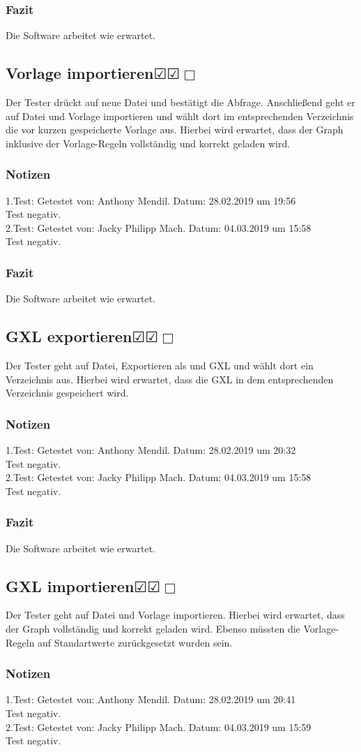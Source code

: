 \documentclass[enabledeprecatedfontcommands]{scrartcl}
\newcommand{\subsectiont}[2]{\subsection[#1]{#1{\normalsize\normalfont #2}}}
\newcommand{\leer}{$\Box$}
\newcommand{\ok}{$\CheckedBox$}
\begin{document}
\subsubsection{Fazit}
Die Software arbeitet wie erwartet.

\subsectiont{Vorlage importieren}{\dotfill\ok\ok\leer}
Der Tester drückt auf neue Datei und bestätigt die Abfrage. Anschließend geht er auf Datei und Vorlage importieren und wählt dort im entsprechenden Verzeichnis die vor kurzen gespeicherte Vorlage aus. Hierbei wird erwartet, dass der Graph inklusive der Vorlage-Regeln vollständig und korrekt geladen wird. 
\subsubsection{Notizen}
1.Test: Getestet von: Anthony Mendil. Datum: 28.02.2019 um 19:56 \\
Test negativ.\\
2.Test: Getestet von: Jacky Philipp Mach. Datum: 04.03.2019 um 15:58 \\
Test negativ.
\subsubsection{Fazit}
Die Software arbeitet wie erwartet.

\subsectiont{GXL exportieren}{\dotfill\ok\ok\leer}
Der Tester geht auf Datei, Exportieren als und GXL und wählt dort ein Verzeichnis aus. Hierbei wird erwartet, dass die GXL in dem entsprechenden Verzeichnis gespeichert wird.
\subsubsection{Notizen}
1.Test: Getestet von: Anthony Mendil. Datum: 28.02.2019 um 20:32 \\
Test negativ.\\
2.Test: Getestet von: Jacky Philipp Mach. Datum: 04.03.2019 um 15:58 \\
Test negativ.
\subsubsection{Fazit}
Die Software arbeitet wie erwartet.

\subsectiont{GXL importieren}{\dotfill\ok\ok\leer}
Der Tester geht auf Datei und Vorlage importieren. Hierbei wird erwartet, dass der Graph vollständig und korrekt geladen wird. Ebenso müssten die Vorlage-Regeln auf Standartwerte zurückgesetzt wurden sein. 
\subsubsection{Notizen}
1.Test: Getestet von: Anthony Mendil. Datum: 28.02.2019 um 20:41 \\
Test negativ.\\
2.Test: Getestet von: Jacky Philipp Mach. Datum: 04.03.2019 um 15:59 \\
Test negativ.
\end{document}
